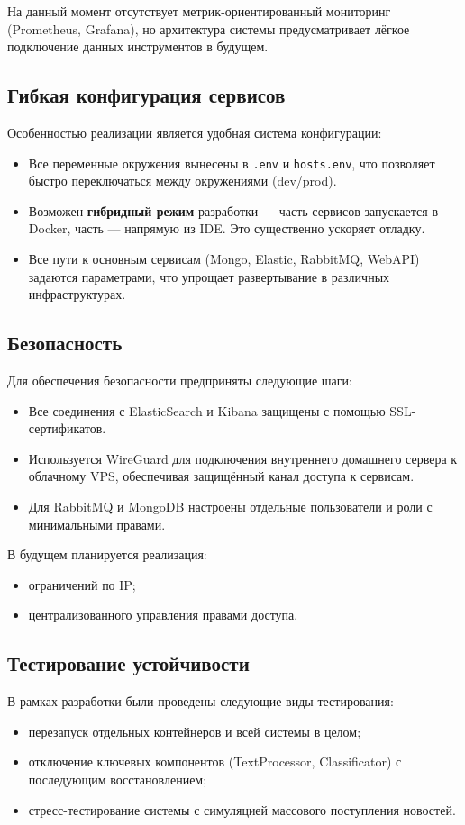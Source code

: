 На данный момент отсутствует метрик-ориентированный мониторинг (Prometheus, Grafana), но архитектура системы предусматривает лёгкое подключение данных инструментов в будущем.

\subsection{Гибкая конфигурация сервисов}
Особенностью реализации является удобная система конфигурации:
\begin{itemize}
  \item Все переменные окружения вынесены в \texttt{.env} и \texttt{hosts.env}, что позволяет быстро переключаться между окружениями (dev/prod).
  \item Возможен \textbf{гибридный режим} разработки — часть сервисов запускается в Docker, часть — напрямую из IDE. Это существенно ускоряет отладку.
  \item Все пути к основным сервисам (Mongo, Elastic, RabbitMQ, WebAPI) задаются параметрами, что упрощает развертывание в различных инфраструктурах.
\end{itemize}

\subsection{Безопасность}
Для обеспечения безопасности предприняты следующие шаги:
\begin{itemize}
  \item Все соединения с ElasticSearch и Kibana защищены с помощью SSL-сертификатов.
  \item Используется WireGuard для подключения внутреннего домашнего сервера к облачному VPS, обеспечивая защищённый канал доступа к сервисам.
  \item Для RabbitMQ и MongoDB настроены отдельные пользователи и роли с минимальными правами.
\end{itemize}

В будущем планируется реализация:
\begin{itemize}
  \item ограничений по IP;
  \item централизованного управления правами доступа.
\end{itemize}

\subsection{Тестирование устойчивости}\label{subsec:testing}
В рамках разработки были проведены следующие виды тестирования:
\begin{itemize}
  \item перезапуск отдельных контейнеров и всей системы в целом;
  \item отключение ключевых компонентов (TextProcessor, Classificator) с последующим восстановлением;
  \item стресс-тестирование системы с симуляцией массового поступления новостей.
\end{itemize}

